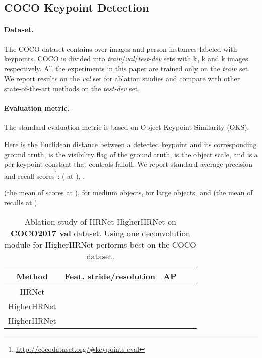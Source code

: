 \documentclass[10pt,twocolumn,letterpaper]{article}
\begin{document}
\subsection{COCO Keypoint Detection}
\vspace{-2mm}

\paragraph{Dataset.} The COCO dataset \cite{lin2014microsoft} contains over  images and  person instances labeled with  keypoints. COCO is divided into \textit{train}/\textit{val}/\textit{test-dev} sets with k, k and k images respectively. All the experiments in this paper are trained only on the \textit{train} set. We report results on the \textit{val} set for ablation studies and compare with other state-of-the-art methods on the \textit{test-dev} set.
\vspace{-4mm}
\paragraph{Evaluation metric.}
The standard evaluation metric
is
based on Object Keypoint Similarity (OKS):

Here  is the Euclidean distance between 
a detected keypoint and its corresponding ground truth,
 is the visibility flag of the ground truth,
 is the object scale, and 
 is a per-keypoint constant that controls falloff.
We report standard average precision and recall scores\footnote{\url{http://cocodataset.org/\#keypoints-eval}}:
 ( at ),
,
 
(the mean of  scores at 
), 
  for medium objects,
  for large objects,
and  (the mean of recalls at ). 

\begin{table}[bpt]
    \centering
    \setlength{\tabcolsep}{2.0pt}
    \begin{tabular}{c|c|ccc}
    Method&  Feat. stride/resolution& AP &&\\
    \hline
    HRNet&&&&\\ 
    HigherHRNet&&&&\\ 
    HigherHRNet&&&&\\ 
    \end{tabular}\vspace{2mm}
    \caption{Ablation study of HRNet \vs HigherHRNet on \textbf{COCO2017 val} dataset. Using one deconvolution module for HigherHRNet performs best on the COCO dataset.}
    \label{tab:ablation_highernet}
    \vspace{-2mm}
\end{table}
\vspace{-4mm}
\end{document}
